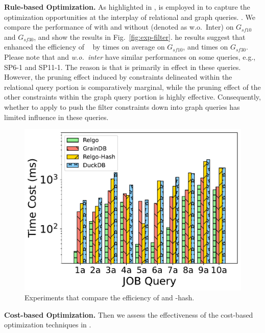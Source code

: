 \noindent\textbf{Rule-based Optimization.}
As highlighted in , \filterrule is employed in \relgo to capture the optimization opportunities at the interplay of relational and graph queries. .
We compare the performance of \relgo with and without (denoted as \relgo w.o.~Inter) \filterrule on $G_{sf10}$ and $G_{sf30}$, and show the results in Fig.~\ref{fig:exp-filter}.
he results suggest that \filterrule~ enhanced the efficiency of \relgo~ by  times on average on $G_{sf10}$, and  times on $G_{sf30}$.
Please note that \relgo and \textit{\relgo w.o.~inter} have similar performances on some queries, e.g., SP6-1 and SP11-1.
The reason is that \filterrule is primarily in effect in these queries.
However, the pruning effect induced by constraints delineated within the relational query portion is comparatively marginal, while the pruning effect of the other constraints within the graph query portion is highly effective.
Consequently, whether to apply \filterrule to push the filter constraints down into graph queries has limited influence in these queries.

\begin{figure}[ht]
    \centering
    \includegraphics[width=.9\linewidth]{./figures/exp/hash_plan_job.pdf}
    \caption{Experiments that compare the efficiency of \relgo and \relgo-hash.}
    \label{fig:exp-hash-plan}
\end{figure}
\noindent\textbf{Cost-based Optimization.}
Then we assess the effectiveness of the cost-based optimization techniques in \relgo.


